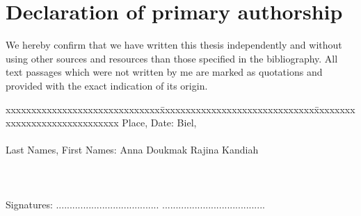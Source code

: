 \chapter*{Declaration of primary authorship}
\label{chap:declaration_authorship}

\vspace*{10mm} 

We hereby confirm that we have written this thesis independently and without using other sources and resources than those specified in the bibliography. All text passages which were not written by me are marked as quotations and provided with the exact indication of its origin. 

\vspace{15mm}

\begin{tabbing}
xxxxxxxxxxxxxxxxxxxxxxxxxxxxxx\=xxxxxxxxxxxxxxxxxxxxxxxxxxxxxx\=xxxxxxxxxxxxxxxxxxxxxxxxxxxxxx\kill
Place, Date:		\> Biel, \versiondate \\ \\ 
Last Names, First Names:	\> Anna Doukmak 	\> Rajina Kandiah \\ \\ \\ \\ 
Signatures:	\> ......................................\> ...................................... \\
\end{tabbing}
